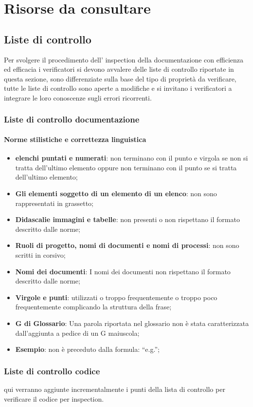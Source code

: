 \section{Risorse da consultare}
	\subsection{Liste di controllo}
		Per svolgere il procedimento dell’ inspection della documentazione con efficienza ed efficacia i verificatori si devono avvalere delle liste di controllo riportate in questa sezione, sono differenziate sulla base del tipo di proprietà da verificare, tutte le liste di controllo sono aperte a modifiche e si invitano i verificatori a integrare le loro conoscenze sugli errori ricorrenti.\\
		\subsubsection{Liste di controllo documentazione}
			\paragraph{Norme stilistiche e correttezza linguistica}
				\begin{itemize}
					\item\textbf{elenchi puntati e numerati}: non terminano con il punto e virgola se non si tratta dell’ultimo elemento oppure non terminano con il punto se si tratta dell’ultimo elemento;
					\item\textbf{Gli elementi soggetto di un elemento di un elenco}: non sono rappresentati in grassetto;
					\item\textbf{Didascalie immagini e tabelle}: non presenti o non rispettano il formato descritto dalle norme;
					\item\textbf{Ruoli di progetto, nomi di documenti e nomi di processi}: non sono scritti in corsivo;
					\item\textbf{Nomi dei documenti}: I nomi dei documenti non rispettano il formato descritto dalle norme;
					\item\textbf{Virgole e punti}: utilizzati o troppo frequentemente o troppo poco frequentemente complicando la struttura della frase;
					\item\textbf{G di Glossario}: Una parola riportata nel glossario non è stata caratterizzata dall’aggiunta a pedice di un G maiuscola;
					\item\textbf{Esempio}: non è preceduto dalla formula: “e.g.”;
				\end{itemize}
				
		\subsubsection{Liste di controllo codice}
			qui verranno aggiunte incrementalmente i punti della lista di controllo per verificare il codice per inspection.
			
